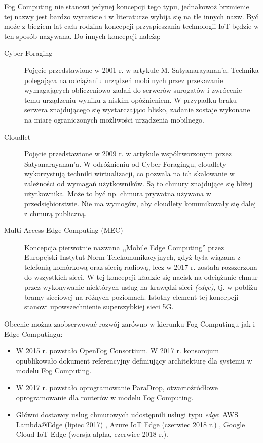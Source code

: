 \documentclass[12pt,a4paper,twoside,titlepage,openright]{book}
\begin{document}
Fog Computing nie stanowi jedynej koncepcji tego typu, jednakowoż brzmienie tej nazwy jest bardzo wyraziste i w literaturze wybija się na tle innych nazw. Być może z biegiem lat cała rodzina koncepcji przyspieszania technologii IoT będzie w ten sposób nazywana. Do innych koncepcji należą:
\begin{description}
\item [Cyber Foraging] Pojęcie przedstawione w 2001 r. w artykule M. Satyanarayanan'a. Technika polegająca na odciążaniu urządzeń mobilnych przez przekazanie wymagających obliczeniowo zadań do serwerów-surogatów i zwrócenie temu urządzeniu wyniku z niskim opóźnieniem. W przypadku braku serwera znajdującego się wystarczająco blisko, zadanie zostaje wykonane na miarę ograniczonych możliwości urządzenia mobilnego. \cite{fogArticle, fog5g}
\item [Cloudlet] Pojęcie przedstawione w 2009 r. w artykule współtworzonym przez Satyanarayanan'a. W odróżnieniu od Cyber Foragingu, cloudlety wykorzystują techniki wirtualizacji, co pozwala na ich skalowanie w zależności od wymagań użytkowników. Są to chmury znajdujące się bliżej użytkownika. Może to być np. chmura prywatna używana w przedsiębiorstwie. Nie ma wymogów, aby cloudlety komunikowały się dalej z chmurą publiczną. \cite{fogArticle, fog5g}
\item [Multi-Access Edge Computing (MEC)] Koncepcja pierwotnie nazwana ,,Mobile Edge Computing'' przez Europejski Instytut Norm Telekomunikacyjnych, gdyż była wiązana z telefonią komórkową oraz siecią radiową, lecz w 2017 r. została rozszerzona do wszystkich sieci. W tej koncepcji kładzie się nacisk na odciążanie chmur przez wykonywanie niektórych usług na krawędzi sieci \textit{(edge)}, tj. w pobliżu bramy sieciowej na różnych poziomach. Istotny element tej koncepcji stanowi upowszechnienie superszybkiej sieci 5G. \cite{fogArticle, fog5g}
\end{description}

Obecnie można zaobserwować rozwój zarówno w kierunku Fog Computingu jak i Edge Computingu:
\begin{itemize}
\item W 2015 r. powstało OpenFog Consortium. W 2017 r. konsorcjum opublikowało dokument referencyjny definiujący architekturę dla systemu w modelu Fog Computing. \cite{fogArticle, iotArchitects}
\item W 2017 r. powstało oprogramowanie ParaDrop, otwartoźródłowe oprogramowanie dla routerów w modelu Fog Computing. \cite{fog5g}
\item Główni dostawcy usług chmurowych udostępnili usługi typu \textit{edge}: AWS Lambda@Edge (lipiec 2017) \cite{siteAmazonLambdaEdge}, Azure IoT Edge (czerwiec 2018 r.) \cite{siteAzureIotEdge}, Google Cloud IoT Edge (wersja alpha, czerwiec 2018 r.)\cite{siteGoogleIotEdge}. 
\end{itemize}
\end{document}
